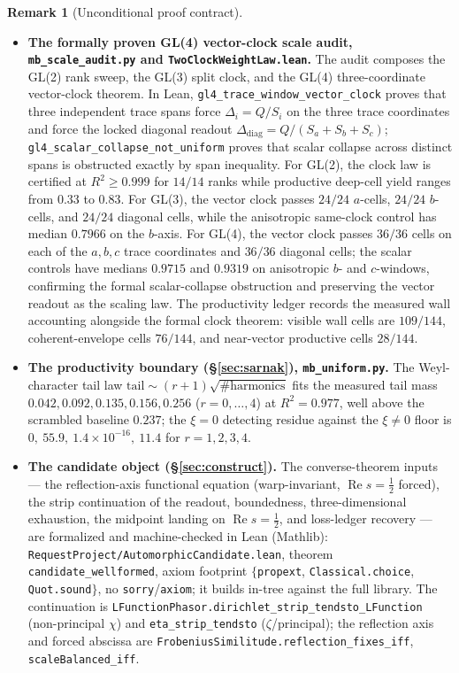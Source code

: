 \documentclass[11pt]{article}
\theoremstyle{definition}
\newtheorem{remark}[theorem]{Remark}
\renewcommand{\Re}{\operatorname{Re}}
\begin{document}
\begin{remark}[Unconditional proof contract]
\begin{enumerate}
\begin{itemize}
\item \textbf{The formally proven GL(4) vector-clock scale audit, \texttt{mb\_scale\_audit.py} and
\texttt{TwoClockWeightLaw.lean}.} The audit composes the GL(2) rank sweep, the GL(3) split clock, and the
GL(4) three-coordinate vector-clock theorem. In Lean,
\texttt{gl4\_trace\_window\_vector\_clock} proves that three independent trace spans force
$\Delta_i=Q/S_i$ on the three trace coordinates and force the locked diagonal readout
$\Delta_{\mathrm{diag}}=Q/(S_a+S_b+S_c)$; \texttt{gl4\_scalar\_collapse\_not\_uniform} proves that scalar
collapse across distinct spans is obstructed exactly by span inequality. For GL(2), the clock law is certified
at $R^2\ge0.999$ for $14/14$ ranks while productive deep-cell yield ranges from $0.33$ to $0.83$. For GL(3),
the vector clock passes $24/24$ $a$-cells, $24/24$ $b$-cells, and $24/24$ diagonal cells, while the anisotropic
same-clock control has median $0.7966$ on the $b$-axis. For GL(4), the vector clock passes $36/36$ cells on
each of the $a,b,c$ trace coordinates and $36/36$ diagonal cells; the scalar controls have medians $0.9715$ and
$0.9319$ on anisotropic $b$- and $c$-windows, confirming the formal scalar-collapse obstruction and preserving
the vector readout as the scaling law. The productivity ledger records the measured wall accounting alongside
the formal clock theorem: visible wall cells are $109/144$, coherent-envelope cells $76/144$, and near-vector
productive cells $28/144$.

\item \textbf{The productivity boundary (\S\ref{sec:sarnak}), \texttt{mb\_uniform.py}.} The
Weyl-character tail law $\text{tail}\sim(r{+}1)\sqrt{\#\text{harmonics}}$ fits the measured tail mass
$0.042,0.092,0.135,0.156,0.256$ ($r=0,\dots,4$) at $R^2=0.977$, well above the scrambled baseline
$0.237$; the $\xi=0$ detecting residue against the $\xi\neq0$ floor is
$0,\ 55.9,\ 1.4\times10^{-16},\ 11.4$ for $r=1,2,3,4$.

\item \textbf{The candidate object (\S\ref{sec:construct}).} The converse-theorem inputs --- the
reflection-axis functional equation (warp-invariant, $\Re s=\tfrac12$ forced), the strip continuation
of the readout, boundedness, three-dimensional exhaustion, the midpoint landing on $\Re s=\tfrac12$,
and loss-ledger recovery --- are formalized and machine-checked in Lean (Mathlib):
\texttt{RequestProject/AutomorphicCandidate.lean}, theorem \texttt{candidate\_wellformed}, axiom
footprint $\{$\texttt{propext}, \texttt{Classical.choice}, \texttt{Quot.sound}$\}$, no
\texttt{sorry}/\texttt{axiom}; it builds in-tree against the full library. The continuation is
\texttt{LFunctionPhasor.dirichlet\_strip\_tendsto\_LFunction} (non-principal $\chi$) and
\texttt{eta\_strip\_tendsto} ($\zeta$/principal); the reflection axis and forced abscissa are
\texttt{FrobeniusSimilitude.reflection\_fixes\_iff}, \texttt{scaleBalanced\_iff}.


\end{itemize}
\end{enumerate}
\end{remark}
\end{document}
